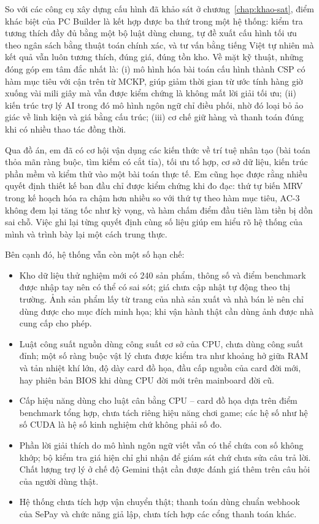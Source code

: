 So với các công cụ xây dựng cấu hình đã khảo sát ở chương~\ref{chap:khao-sat}, điểm khác biệt của PC Builder là kết hợp được ba thứ trong một hệ thống: kiểm tra tương thích đầy đủ bằng một bộ luật dùng chung, tự đề xuất cấu hình tối ưu theo ngân sách bằng thuật toán chính xác, và tư vấn bằng tiếng Việt tự nhiên mà kết quả vẫn luôn tương thích, đúng giá, đúng tồn kho. Về mặt kỹ thuật, những đóng góp em tâm đắc nhất là: (i) mô hình hóa bài toán cấu hình thành CSP có hàm mục tiêu với cận trên từ MCKP, giúp giảm thời gian từ ước tính hàng giờ xuống vài mili giây mà vẫn được kiểm chứng là không mất lời giải tối ưu; (ii) kiến trúc trợ lý AI trong đó mô hình ngôn ngữ chỉ điều phối, nhờ đó loại bỏ ảo giác về linh kiện và giá bằng cấu trúc; (iii) cơ chế giữ hàng và thanh toán đúng khi có nhiều thao tác đồng thời.

Qua đồ án, em đã có cơ hội vận dụng các kiến thức về trí tuệ nhân tạo (bài toán thỏa mãn ràng buộc, tìm kiếm có cắt tỉa), tối ưu tổ hợp, cơ sở dữ liệu, kiến trúc phần mềm và kiểm thử vào một bài toán thực tế. Em cũng học được rằng nhiều quyết định thiết kế ban đầu chỉ được kiểm chứng khi đo đạc: thứ tự biến MRV trong kế hoạch hóa ra chậm hơn nhiều so với thứ tự theo hàm mục tiêu, AC-3 không đem lại tăng tốc như kỳ vọng, và hàm chấm điểm đầu tiên làm tiền bị dồn sai chỗ. Việc ghi lại từng quyết định cùng số liệu giúp em hiểu rõ hệ thống của mình và trình bày lại một cách trung thực.

Bên cạnh đó, hệ thống vẫn còn một số hạn chế:
\begin{itemize}
  \item Kho dữ liệu thử nghiệm mới có 240 sản phẩm, thông số và điểm benchmark được nhập tay nên có thể có sai sót; giá chưa cập nhật tự động theo thị trường. Ảnh sản phẩm lấy từ trang của nhà sản xuất và nhà bán lẻ nên chỉ dùng được cho mục đích minh họa; khi vận hành thật cần dùng ảnh được nhà cung cấp cho phép.
  \item Luật công suất nguồn dùng công suất cơ sở của CPU, chưa dùng công suất đỉnh; một số ràng buộc vật lý chưa được kiểm tra như khoảng hở giữa RAM và tản nhiệt khí lớn, độ dày card đồ họa, đầu cấp nguồn của card đời mới, hay phiên bản BIOS khi dùng CPU đời mới trên mainboard đời cũ.
  \item Cấp hiệu năng dùng cho luật cân bằng CPU -- card đồ họa dựa trên điểm benchmark tổng hợp, chưa tách riêng hiệu năng chơi game; các hệ số như hệ số CUDA là hệ số kinh nghiệm chứ không phải số đo.
  \item Phần lời giải thích do mô hình ngôn ngữ viết vẫn có thể chứa con số không khớp; bộ kiểm tra giá hiện chỉ ghi nhận để giám sát chứ chưa sửa câu trả lời. Chất lượng trợ lý ở chế độ Gemini thật cần được đánh giá thêm trên câu hỏi của người dùng thật.
  \item Hệ thống chưa tích hợp vận chuyển thật; thanh toán dùng chuẩn webhook của SePay và chức năng giả lập, chưa tích hợp các cổng thanh toán khác.
\end{itemize}

